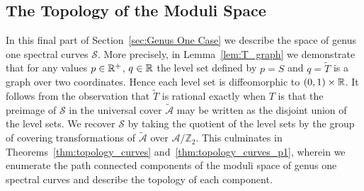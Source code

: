 \documentclass{article}
\begin{document}










\subsection{The Topology of the Moduli Space}
\label{subsec:Topology}

In this final part of Section~\ref{sec:Genus One Case} we describe the space of genus one spectral curves $\mathcal{S}$. 
More precisely,
in Lemma~\ref{lem:T_graph} we demonstrate that for any values $p \in \mathbb{R}^+$, $q\in\mathbb{R}$ the level set defined by $p = S$ and $q = \tilde{T}$ is a graph over two coordinates. 
Hence each level set is diffeomorphic to $(0,1)\times\mathbb{R}$.
It follows from the observation that $\tilde{T}$ is rational exactly when $T$ is that the preimage of $\mathcal{S}$ in the universal cover $\mathcal{\tilde{A}}$ may be written as the disjoint union of the level sets.
We recover $\mathcal{S}$ by taking the quotient of the level sets by the group of covering transformations of $\mathcal{\tilde{A}}$ over $\mathcal{A}/\mathbb{Z}_2$. This culminates in Theorems~\ref{thm:topology_curves} and~\ref{thm:topology_curves_p1}, wherein we enumerate the path connected components of the moduli space of genus one spectral curves and describe the topology of each component.
\end{document}
